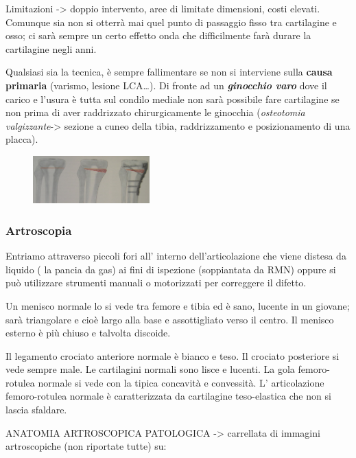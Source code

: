 Limitazioni -> doppio intervento, aree di limitate dimensioni, costi elevati. Comunque sia non si otterrà mai quel punto di passaggio fisso tra cartilagine e osso; ci sarà sempre un certo effetto onda che
difficilmente farà durare la cartilagine negli anni.

Qualsiasi sia la tecnica, è sempre fallimentare se non si interviene sulla \textbf{causa primaria} (varismo, lesione LCA\ldots{}). Di fronte ad un \emph{\textbf{ginocchio varo}} dove il carico e l'usura è tutta sul condilo mediale non sarà possibile fare cartilagine se non prima di aver raddrizzato chirurgicamente le ginocchia (\emph{osteotomia valgizzante}-> sezione a cuneo della tibia, raddrizzamento e posizionamento di una placca).

\begin{figure}[!ht]
\centering
\includegraphics[width=0.4\textwidth]{009/image18.jpeg}
\end{figure}

\subsubsection{Artroscopia}

Entriamo attraverso piccoli fori all' interno dell'articolazione che viene distesa da liquido ( la pancia da gas) ai fini di ispezione (soppiantata da RMN) oppure si può utilizzare strumenti manuali o
motorizzati per correggere il difetto.

Un menisco normale lo si vede tra femore e tibia ed è sano, lucente in un giovane; sarà triangolare e cioè largo alla base e assottigliato verso il centro. Il menisco esterno è più chiuso e talvolta discoide.

Il legamento crociato anteriore normale è bianco e teso. Il crociato posteriore si vede sempre male. Le cartilagini normali sono lisce e lucenti. La gola femoro-rotulea normale si vede con la tipica concavità
e convessità. L' articolazione femoro-rotulea normale è caratterizzata da cartilagine teso-elastica che non si lascia sfaldare.

ANATOMIA ARTROSCOPICA PATOLOGICA -> carrellata di immagini artroscopiche
(non riportate tutte) su:

